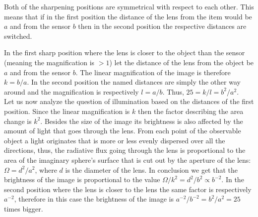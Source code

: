 \hinteng
Both of the sharpening positions are symmetrical with respect to each other. This means that if in the first position the distance of the lens from the item would be $a$ and from the sensor $b$ then in the second position the respective distances are switched.

\solueng
In the first sharp position where the lens is closer to the object than the sensor (meaning the magnification is $>1$) let the distance of the lens from the object be $a$ and from the sensor $b$. The linear magnification of the image is therefore $k=b/a$. In the second position the named distances are simply the other way around and the magnification is respectively $l=a/b$. Thus, $25=k/l=b^2/a^2$.\\
Let us now analyze the question of illumination based on the distances of the first position. Since the linear magnification is $k$ then the factor describing the area change is $k^2$. Besides the size of the image its brightness is also affected by the amount of light that goes through the lens. From each point of the observable object a light originates that is more or less evenly dispersed over all the directions, thus, the radiative flux going through the lens is proportional to the area of the imaginary sphere’s surface that is cut out by the aperture of the lens: $\Omega=d^2/a^2$, where $d$ is the diameter of the lens. In conclusion we get that the brightness of the image is proportional to the value $\Omega/k^2=d^2/b^2\propto b^{-2}$. In the second position where the lens is closer to the lens the same factor is respectively $a^{-2}$, therefore in this case the brightness of the image is $a^{-2}/b^{-2}=b^2/a^2=25$ times bigger.
\probend